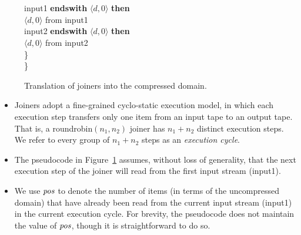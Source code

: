 \begin{figure}[t!]
\begin{minipage}{0.75\textwidth}
\tab\tab\\
\tab{}\\
\tab{} input1 {\bf endswith} $\langle d, 0 \rangle$ {\bf then}\\
\tab\tab{} $\langle d,0 \rangle$ from input1\\
\tab{} input2 {\bf endswith} $\langle d, 0 \rangle$ {\bf then}\\
\tab\tab{} $\langle d,0 \rangle$ from input2\\
\tab\}\\
\}
\end{minipage}
\caption[Translation of joiners into the compressed
  domain.]{Translation of joiners into the compressed domain.
\protect\label{fig:translate-joiner}}
\end{figure}

\begin{itemize}

\item Joiners adopt a fine-grained cyclo-static
  execution model, in which each execution step transfers only one
  item from an input tape to an output tape.  That is, a
  roundrobin$(n_1, n_2)$ joiner has $n_1 + n_2$ distinct execution
  steps.  We refer to every group of $n_1 + n_2$ steps as an {\it
  execution cycle}.

\item The pseudocode in Figure~\ref{fig:translate-joiner} assumes,
  without loss of generality, that the next execution step of the
  joiner will read from the first input stream (input1).

\item We use $\mbox{\it pos}$ to denote the number of items (in terms of the
  uncompressed domain) that have already been read from the current
  input stream (input1) in the current execution cycle.  For brevity,
  the pseudocode does not maintain the value of $\mbox{\it pos}$, though it is
  straightforward to do so.

\end{itemize}

